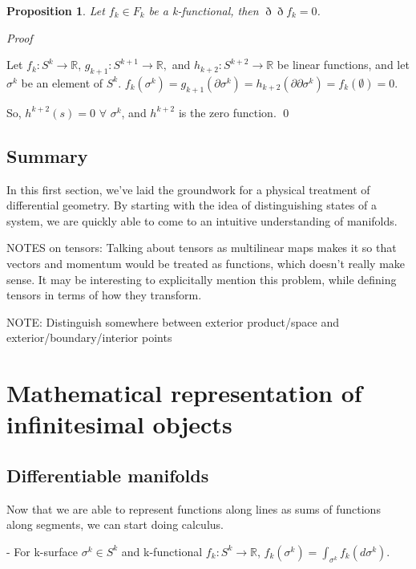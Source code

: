 \documentclass{book}
\newtheorem{prop}[equation]{Proposition}
\renewenvironment{proof}{\emph{Proof}}{\qed}
\begin{document}
\begin{prop}
	Let $f_k \in F_k$ be a k-functional, then $\eth\eth f_k = 0 $.
	
	
\end{prop}
\begin{proof}

	Let $f_k : S^k \to \mathbb{R}$, $g_{k+1} : S^{k+1} \to \mathbb{R},$ and $h_{k+2}: S^{k+2} \to \mathbb{R}$ be linear functions, and let $\sigma^k$ be an element of $S^k$. $f_k(\sigma^k) = g_{k+1}(\partial \sigma^k) = h_{k+2}(\partial\partial \sigma^k) = f_k(\emptyset) = 0$. 
	
	So, $h^{k+2}(s) = 0$ $\forall$ $\sigma^k$, and $h^{k+2}$ is the zero function. 
\end{proof}

\section{Summary}


In this first section, we've laid the groundwork for a physical treatment of differential geometry. By starting with the idea of distinguishing states of a system, we are quickly able to come to an intuitive understanding of manifolds. 



NOTES on tensors: Talking about tensors as multilinear maps makes it so that vectors and momentum would be treated as functions, which doesn't really make sense. It may be interesting to explicitally mention this problem, while defining tensors in terms of how they transform. 

NOTE: Distinguish somewhere between exterior product/space and exterior/boundary/interior points

\chapter{Mathematical representation of infinitesimal objects}


\section{Differentiable manifolds}

Now that we are able to represent functions along lines as sums of functions along segments, we can start doing calculus. 


- For k-surface $\sigma^k \in S^k$ and k-functional $f_k: S^k \to \mathbb{R}$, $f_k(\sigma^k) = \int_{\sigma^k}f_k(d\sigma^k)$. 
\end{document}
